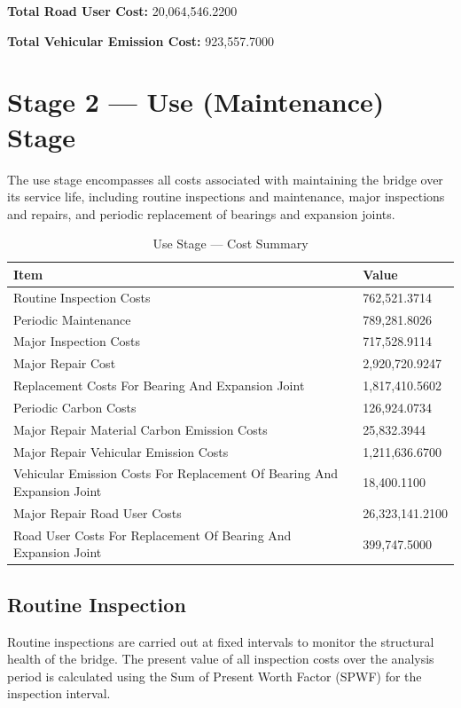 \documentclass[12pt,a4paper]{article}
\begin{document}
\textbf{Total Road User Cost:} 20,064,546.2200


\textbf{Total Vehicular Emission Cost:} 923,557.7000



\section{Stage 2 --- Use (Maintenance) Stage}

The use stage encompasses all costs associated with maintaining the bridge over its service life, including routine inspections and maintenance, major inspections and repairs, and periodic replacement of bearings and expansion joints.


\begin{table}[H]
\centering
\caption{Use Stage --- Cost Summary}
\begin{tabular}{L{9cm}R{5cm}}
\toprule
\textbf{Item} & \textbf{Value} \\
\midrule
  Routine Inspection Costs & 762,521.3714 \\
  Periodic Maintenance & 789,281.8026 \\
  Major Inspection Costs & 717,528.9114 \\
  Major Repair Cost & 2,920,720.9247 \\
  Replacement Costs For Bearing And Expansion Joint & 1,817,410.5602 \\
  Periodic Carbon Costs & 126,924.0734 \\
  Major Repair Material Carbon Emission Costs & 25,832.3944 \\
  Major Repair Vehicular Emission Costs & 1,211,636.6700 \\
  Vehicular Emission Costs For Replacement Of Bearing And Expansion Joint & 18,400.1100 \\
  Major Repair Road User Costs & 26,323,141.2100 \\
  Road User Costs For Replacement Of Bearing And Expansion Joint & 399,747.5000 \\
\bottomrule
\end{tabular}
\end{table}


\subsection{Routine Inspection}

Routine inspections are carried out at fixed intervals to monitor the structural health of the bridge. The present value of all inspection costs over the analysis period is calculated using the Sum of Present Worth Factor (SPWF) for the inspection interval.
\end{document}
